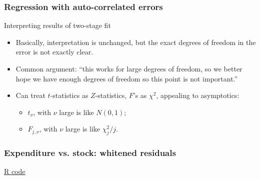 \documentclass[handout]{beamer}
\begin{document}

   \begin{frame} \frametitle{Regression with auto-correlated errors}

   \begin{block}
   {Interpreting results of two-stage fit}
   \begin{itemize}
   \item Basically, interpretation is unchanged, but the exact
   degrees of freedom in the error is not exactly clear.

   \item Common argument: ``this works for large degrees of freedom, so we better hope we have enough degrees of freedom so this point is not important.''


   \item Can treat $t$-statistics as $Z$-statistics, $F$'s as $\chi^2$, appealing to asymptotics:
   \begin{itemize}
   \item $t_{\nu}$, with $\nu$ large is like $N(0,1)$;

   \item $F_{j,\nu}$, with $\nu$ large is like $\chi^2_j/j.$
   \end{itemize}
   \end{itemize}
   \end{block}
   \end{frame}



   \begin{frame}
   \frametitle{Expenditure vs. stock: whitened residuals}
   \begin{center}
   \end{center}
   \href{http://stats191.stanford.edu/correlated_errors.html#consumer-expenditure}{R code}
   \end{frame}
\end{document}
